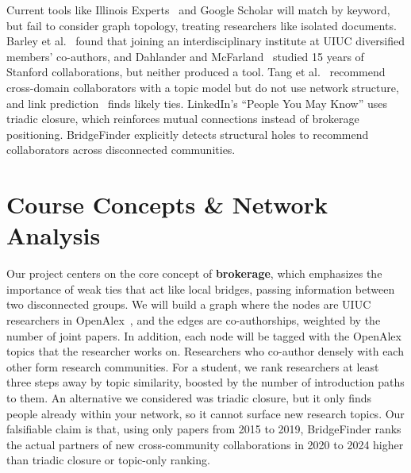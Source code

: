 \documentclass[sigconf,nonacm]{acmart}
\begin{document}
Current tools like Illinois Experts~\cite{experts} and Google Scholar will match by keyword, but fail to consider graph topology, treating researchers like isolated documents. Barley et al.~\cite{barley2025} found that joining an interdisciplinary institute at UIUC diversified members' co-authors, and Dahlander and McFarland~\cite{dahlander2013} studied 15 years of Stanford collaborations, but neither produced a tool. Tang et al.~\cite{tang2012} recommend cross-domain collaborators with a topic model but do not use network structure, and link prediction~\cite{libennowell2007} finds likely ties. LinkedIn's ``People You May Know'' uses triadic closure, which reinforces mutual connections instead of brokerage positioning. BridgeFinder explicitly detects structural holes to recommend collaborators across disconnected communities.


\section{Course Concepts \& Network Analysis}

Our project centers on the core concept of \textbf{brokerage}, which emphasizes the importance of weak ties that act like local bridges, passing information between two disconnected groups. We will build a graph where the nodes are UIUC researchers in OpenAlex~\cite{openalex}, and the edges are co-authorships, weighted by the number of joint papers. In addition, each node will be tagged with the OpenAlex topics that the researcher works on. Researchers who co-author densely with each other form research communities. For a student, we rank researchers at least three steps away by topic similarity, boosted by the number of introduction paths to them. An alternative we considered was triadic closure, but it only finds people already within your network, so it cannot surface new research topics. Our falsifiable claim is that, using only papers from 2015 to 2019, BridgeFinder ranks the actual partners of new cross-community collaborations in 2020 to 2024 higher than triadic closure or topic-only ranking. 


\end{document}
